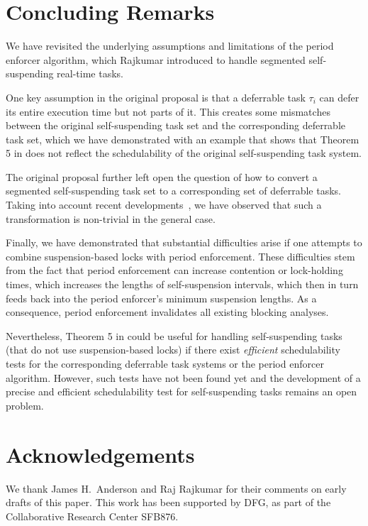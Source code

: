 
\section{Concluding Remarks}
\label{sec:conclusion}

We have revisited the underlying assumptions and limitations of the period enforcer algorithm, which Rajkumar \cite{Raj:suspension1991} introduced to handle segmented self-suspending real-time tasks. 

One key assumption in the original proposal \cite{Raj:suspension1991} is that a deferrable task $\tau_i$ can defer its entire execution time but not parts of it. This creates some mismatches between the original self-suspending task set and the corresponding deferrable task set, which we have demonstrated with an example that shows that Theorem 5 in \cite{Raj:suspension1991} does not reflect the schedulability of the original self-suspending task system. 


The original proposal \cite{Raj:suspension1991} further left open the question of how to convert a segmented self-suspending task set to a corresponding set of deferrable tasks. Taking into account recent developments~\cite{ecrts15nelissen}, we have observed that such a transformation is non-trivial in the general case.  

Finally, we have demonstrated that substantial difficulties arise if one attempts to combine suspension-based locks with period enforcement. These difficulties stem from the fact that period enforcement can increase contention or lock-holding times, which increases the lengths of self-suspension intervals, which then in turn feeds back into the period enforcer's minimum suspension lengths. As a consequence, period enforcement invalidates all existing blocking analyses.

Nevertheless, Theorem 5 in \cite{Raj:suspension1991} could be useful for handling self-suspending tasks (that do not use suspension-based locks) if there exist \emph{efficient} schedulability tests for the corresponding deferrable task systems or the period enforcer algorithm. However, such tests have not been found yet and the development of a precise and efficient schedulability test for self-suspending tasks remains an open problem.


\section*{Acknowledgements}

We thank James H.\ Anderson and Raj Rajkumar for their comments on early drafts of this paper.
This work has been supported by DFG, as part of the Collaborative
Research Center SFB876. %